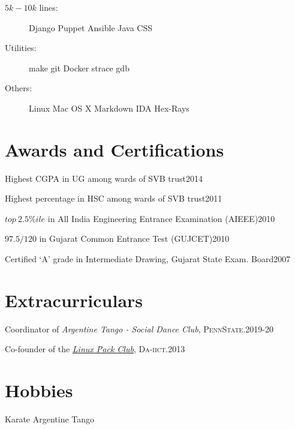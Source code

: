 \documentclass[margin]{res}
\newcommand{\daiict}{\textsc{Da-iict}}
\newcommand{\psu}{\textsc{PennState}}
\begin{document}
\begin{resume}
\begin{description}
    \item[$5k-10k$ lines:]
        Django \textbullet{}
        Puppet \textbullet{}
        Ansible \textbullet{}
        Java \textbullet{}
        CSS

    \item[Utilities:]
        make \textbullet{}
        git \textbullet{}
        Docker \textbullet{}
        strace \textbullet{}
        gdb

    \item[Others:]
        Linux \textbullet{}
        Mac OS X \textbullet{}
        Markdown \textbullet{}
        IDA Hex-Rays
\end{description}

\section{Awards and Certifications}
\begin{itemizemisc}
\item Highest CGPA in UG among wards of SVB trust\hfill 2014
\item Highest percentage in HSC among wards of SVB trust\hfill 2011
\item $top\ 2.5\%ile$ in All India Engineering Entrance Examination (AIEEE)\hfill 2010
\item $97.5 / 120$ in Gujarat Common Entrance Test (GUJCET)\hfill 2010
\item Certified `A' grade in Intermediate Drawing, Gujarat State Exam. Board\hfill 2007
\end{itemizemisc}

\section{Extracurriculars}
\begin{itemizemisc}
\item Coordinator of \emph{Argentine Tango - Social Dance Club}, \psu.\hfill 2019-20 %
\item Co-founder of the \href{http://lpdaiict.wordpress.com/}{\itshape Linux Pack Club}, \daiict.\hfill 2013
\end{itemizemisc}


\section{Hobbies}
    Karate \textbullet{}
    Argentine Tango

\end{resume} 
\end{document}

